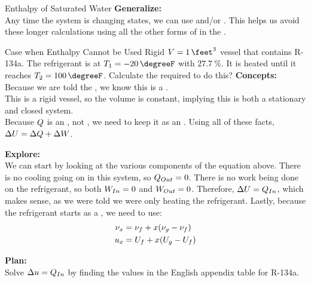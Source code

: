\begin{example}{Enthalpy of Saturated Water}
  \textbf{Generalize:} \\
  Any time the system is changing states, we can use  and/or .
  This helps us avoid these longer calculations using all the other forms of  in the .
\end{example}

\begin{example}{Case when Enthalpy Cannot be Used}
  Rigid $\Volume = \SI{1}{\feet\cubed}$ vessel that contains R-134a.
  The refrigerant is at $\Temp_{1} = \SI{-20}{\degreeF}$ with  $\SI{27.7}{\percent}$.
  It is heated until it reaches $\Temp_{2} = \SI{100}{\degreeF}$.
  Calculate the  required to do this?
  \tcblower{}
  \textbf{Concepts:} \\
  Because we are told the , we know this is a . \\
  This is a rigid vessel, so the volume is constant, implying this is both a stationary and closed system. \\
  Because $Q$ is an , not , we need to keep it as an .
  Using all of these facts, $\Delta U = \Delta Q + \Delta W$.

  \textbf{Explore:} \\
  We can start by looking at the various components of the equation above.
  There is no cooling going on in this system, so $Q_{Out} = 0$.
  There is no work being done on the refrigerant, so both $W_{In} = 0$ and $W_{Out} = 0$.
  Therefore, $\Delta U = Q_{In}$, which makes sense, as we were told we were only heating the refrigerant.
  Lastly, because the refrigerant starts as a , we need to use:
  \begin{align*}
    \nu_{x} &= \nu_{f} + x (\nu_{g} - \nu_{f}) \\
    u_{x} &= U_{f} + x (U_{g} - U_{f})
  \end{align*}

  \textbf{Plan:} \\
  Solve $\Delta u = Q_{In}$ by finding the  values in the English appendix table for R-134a.


\end{example}
